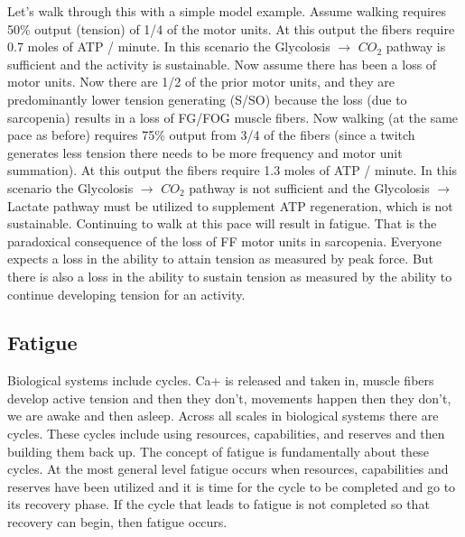 Let's walk through this with a simple model example. Assume walking requires 50\% output (tension) of 1/4 of the motor units. At this output the fibers require 0.7 moles of ATP / minute. In this scenario the Glycolosis $\rightarrow$ $CO_2$ pathway is sufficient and the activity is sustainable. Now assume there has been a loss of motor units. Now there are 1/2 of the prior motor units, and they are predominantly lower tension generating (S/SO) because the loss (due to sarcopenia) results in a loss of FG/FOG muscle fibers. Now walking (at the same pace as before) requires 75\% output from 3/4 of the fibers (since a twitch generates less tension there needs to be more frequency and motor unit summation). At this output the fibers require 1.3 moles of ATP / minute. In this scenario the Glycolosis $\rightarrow$ $CO_2$ pathway is not sufficient and the Glycolosis $\rightarrow$ Lactate pathway must be utilized to supplement ATP regeneration, which is not sustainable. Continuing to walk at this pace will result in fatigue. That is the paradoxical consequence of the loss of FF motor units in sarcopenia. Everyone expects a loss in the ability to attain tension as measured by peak force. But there is also a loss in the ability to sustain tension as measured by the ability to continue developing tension for an activity.


\subsection{Fatigue}

Biological systems include cycles. Ca+ is released and taken in, muscle fibers develop active tension and then they don't, movements happen then they don't, we are awake and then asleep. Across all scales in biological systems there are cycles. These cycles include using resources, capabilities, and reserves and then building them back up. The concept of fatigue is fundamentally about these cycles. At the most general level fatigue occurs when resources, capabilities and reserves have been utilized and it is time for the cycle to be completed and go to its recovery phase. If the cycle that leads to fatigue is not completed so that recovery can begin, then fatigue occurs.

